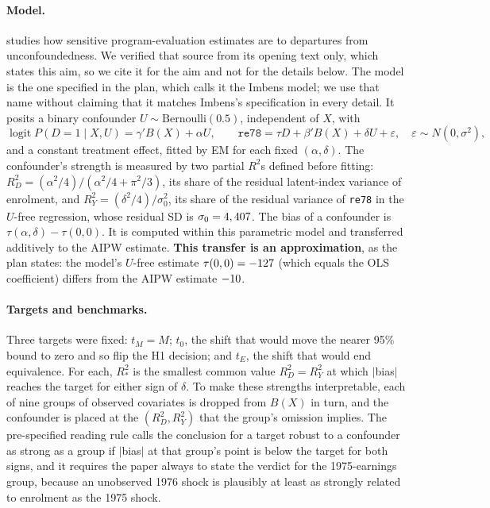 \documentclass[11pt]{article}
\newcommand{\var}[1]{\texttt{#1}}
\begin{document}
\paragraph{Model.} \citet{imbens2003} studies how sensitive program-evaluation estimates are
to departures from unconfoundedness. We verified that source from its opening text only,
which states this aim, so we cite it for the aim and not for the details below. The model
is the one specified in the plan, which calls it the Imbens model; we use that name without
claiming that it matches Imbens's specification in every detail. It posits a binary confounder
$U \sim \text{Bernoulli}(0.5)$, independent of $X$, with
\[
\operatorname{logit} P(D = 1 \mid X, U) = \gamma' B(X) + \alpha U, \qquad
\var{re78} = \tau D + \beta' B(X) + \delta U + \varepsilon, \quad
\varepsilon \sim N(0, \sigma^2),
\]
and a constant treatment effect, fitted by EM for each fixed $(\alpha, \delta)$. The
confounder's strength is measured by two partial $R^2$s defined before fitting:
$R^2_D = (\alpha^2/4)/(\alpha^2/4 + \pi^2/3)$, its share of the residual latent-index variance
of enrolment, and $R^2_Y = (\delta^2/4)/\sigma_0^2$, its share of the residual variance of
\var{re78} in the $U$-free regression, whose residual SD is $\sigma_0 = 4,407$. The
bias of a confounder is $\tau(\alpha, \delta) - \tau(0, 0)$. It is computed within this
parametric model and transferred additively to the AIPW estimate. \textbf{This transfer is an
approximation}, as the plan states: the model's $U$-free estimate $\tau(0, 0) = -127$
(which equals the OLS coefficient) differs from the AIPW estimate $-10$.

\paragraph{Targets and benchmarks.} Three targets were fixed: $t_M = M$; $t_0$, the shift
that would move the nearer 95\% bound to zero and so flip the H1 decision; and $t_E$, the
shift that would end equivalence. For each, $R^2_*$ is the smallest common value
$R^2_D = R^2_Y$ at which $|$bias$|$ reaches the target for either sign of $\delta$. To make
these strengths interpretable, each of nine groups of observed covariates is dropped from
$B(X)$ in turn, and the confounder is placed at the $(R^2_D, R^2_Y)$ that the group's
omission implies. The pre-specified reading rule calls the conclusion for a target robust
to a confounder as strong as a group if $|$bias$|$ at that group's point is below the target
for both signs, and it requires the paper always to state the verdict for the 1975-earnings
group, because an unobserved 1976 shock is plausibly at least as strongly related to
enrolment as the 1975 shock.
\end{document}
